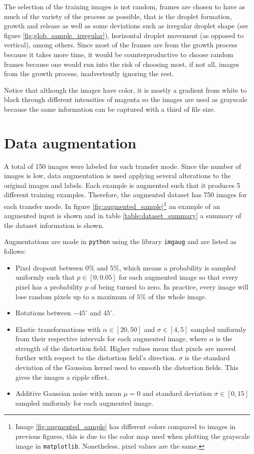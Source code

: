 The selection of the training images is not random, frames are chosen to have as much of the variety of the process as possible, that is the droplet formation, growth and release as well as some deviations such as irregular droplet shape (see figure \ref{fig:glob_sample_irregular}), horizontal droplet movement (as opposed to vertical), among others. Since most of the frames are from the growth process because it takes more time, it would be counterproductive to choose random frames because one would run into the risk of choosing most, if not all, images from the growth process, inadvertently ignoring the rest.

Notice that although the images have color, it is mostly a gradient from white to black through different intensities of magenta so the images are used as grayscale because the same information can be captured with a third of file size.

\section{Data augmentation}
A total of 150 images were labeled for each transfer mode. Since the number of images is low, data augmentation is used applying several alterations to the original images and labels. Each example is augmented such that it produces 5 different training examples. Therefore, the augmented dataset has 750 images for each transfer mode. In figure \ref{fig:augmented_sample}\footnote{Image \ref{fig:augmented_sample} has different colors compared to images in previous figures, this is due to the color map used when plotting the grayscale image in \texttt{matplotlib}. Nonetheless, pixel values are the same.} an example of an augmented input is shown and in table \ref{table:dataset_summary} a summary of the dataset information is shown.

Augmentations are made in \texttt{python} using the library \texttt{imgaug} and are listed as follows: 
\begin{itemize}
    \item Pixel dropout between $0\%$ and $5\%$, which means a probability is sampled uniformly such that $p \in [0, 0.05]$ for each augmented image so that every pixel has a probability $p$ of being turned to zero. In practice, every image will lose random pixels up to a maximum of $5\%$ of the whole image.
    \item Rotations between $-45^\circ$ and $45^\circ$.
    \item Elastic transformations with $\alpha \in [20, 50]$ and $\sigma\in [4,5]$ sampled uniformly from their respective intervals for each augmented image, where $\alpha$ is the strength of the distortion field. Higher values mean that pixels are moved further with respect to the distortion field's direction. $\sigma$ is the standard deviation of the Gaussian kernel used to smooth the distortion  
    fields. This gives the images a ripple effect.
    \item Additive Gaussian noise with mean $\mu=0$ and standard deviation $\sigma\in[0,15]$ sampled uniformly for each augmented image.
\end{itemize}


